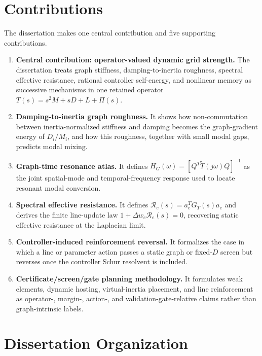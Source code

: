 \section{Contributions}

The dissertation makes one central contribution and five supporting
contributions.

\begin{enumerate}
\item \textbf{Central contribution: operator-valued dynamic grid strength.}
The dissertation treats graph stiffness, damping-to-inertia roughness,
spectral effective resistance, rational controller self-energy, and nonlinear
memory as successive mechanisms in one retained operator
\(T(s)=s^2M+sD+L+\Pi(s)\).
\item \textbf{Damping-to-inertia graph roughness.} It shows how
non-commutation between inertia-normalized stiffness and damping becomes the
graph-gradient energy of \(D_i/M_i\), and how this roughness, together with
small modal gaps, predicts modal mixing.
\item \textbf{Graph-time resonance atlas.} It defines
\(H_G(\omega)=[Q^T\widetilde T(j\omega)Q]^{-1}\) as the joint spatial-mode
and temporal-frequency response used to locate resonant modal conversion.
\item \textbf{Spectral effective resistance.} It defines
\(\mathcal R_e(s)=a_e^TG_T(s)a_e\) and derives the finite line-update law
\(1+\Delta w_e\mathcal R_e(s)=0\), recovering static effective resistance at
the Laplacian limit.
\item \textbf{Controller-induced reinforcement reversal.} It formalizes the
case in which a line or parameter action passes a static graph or fixed-\(D\)
screen but reverses once the controller Schur resolvent is included.
\item \textbf{Certificate/screen/gate planning methodology.} It formulates
weak elements, dynamic hosting, virtual-inertia placement, and line
reinforcement as operator-, margin-, action-, and validation-gate-relative
claims rather than graph-intrinsic labels.
\end{enumerate}

\section{Dissertation Organization}

